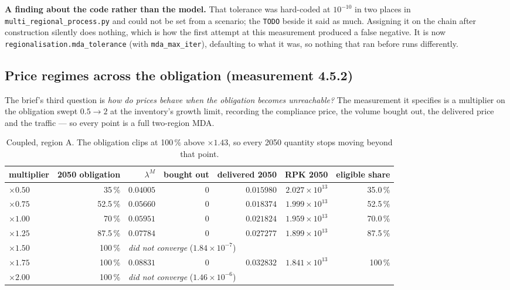 \documentclass[11pt,a4paper]{article}
\newcommand{\var}[1]{\texttt{\small #1}}
\begin{document}
\noindent \textbf{A finding about the code rather than the model.} That tolerance was
hard-coded at $10^{-10}$ in two places in \var{multi\_regional\_process.py} and could not
be set from a scenario; the \var{TODO} beside it said as much. Assigning it on the chain
after construction silently does nothing, which is how the first attempt at this
measurement produced a false negative. It is now \var{regionalisation.mda\_tolerance}
(with \var{mda\_max\_iter}), defaulting to what it was, so nothing that ran before runs
differently.

\subsection{Price regimes across the obligation (measurement 4.5.2)}
\label{sec:regimes}

The brief's third question is \emph{how do prices behave when the obligation becomes
unreachable?} The measurement it specifies is a multiplier on the obligation swept
$0.5 \to 2$ at the inventory's growth limit, recording the compliance price, the volume
bought out, the delivered price and the traffic --- so every point is a full two-region
MDA.

\begin{table}[h]
\centering\small
\begin{tabular}{@{}lrrrrrr@{}}
\toprule
\textbf{multiplier} & \textbf{2050 obligation} & \textbf{$\lambda^{M}$} & \textbf{bought out}
 & \textbf{delivered 2050} & \textbf{RPK 2050} & \textbf{eligible share} \\
\midrule
$\times 0.50$ & 35\,\% & $0.04005$ & 0 & $0.015980$ & $2.027\times10^{13}$ & 35.0\,\% \\
$\times 0.75$ & 52.5\,\% & $0.05660$ & 0 & $0.018374$ & $1.999\times10^{13}$ & 52.5\,\% \\
$\times 1.00$ & 70\,\% & $0.05951$ & 0 & $0.021824$ & $1.959\times10^{13}$ & 70.0\,\% \\
$\times 1.25$ & 87.5\,\% & $0.07784$ & 0 & $0.027277$ & $1.899\times10^{13}$ & 87.5\,\% \\
$\times 1.50$ & 100\,\% & \multicolumn{5}{l}{\emph{did not converge} ($1.84\times10^{-7}$)} \\
$\times 1.75$ & 100\,\% & $0.08831$ & 0 & $0.032832$ & $1.841\times10^{13}$ & 100\,\% \\
$\times 2.00$ & 100\,\% & \multicolumn{5}{l}{\emph{did not converge} ($1.46\times10^{-6}$)} \\
\bottomrule
\end{tabular}
\caption{Coupled, region A. The obligation clips at 100\,\% above $\times 1.43$, so every
2050 quantity stops moving beyond that point.}
\label{tab:regimes}
\end{table}
\end{document}
